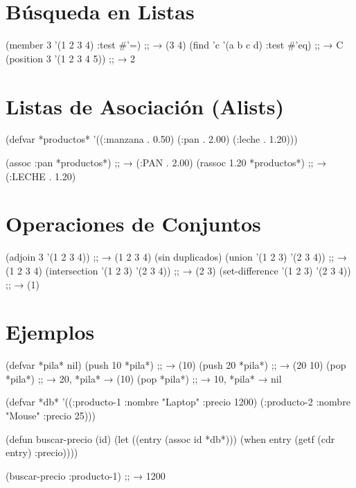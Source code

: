\section{Búsqueda en Listas}

\begin{lispcode}
(member 3 '(1 2 3 4) :test #'=)       ;; → (3 4)
(find 'c '(a b c d) :test #'eq)       ;; → C
(position 3 '(1 2 3 4 5))              ;; → 2
\end{lispcode}

\section{Listas de Asociación (Alists)}

\begin{lispcode}
(defvar *productos*
  '((:manzana . 0.50)
    (:pan . 2.00)
    (:leche . 1.20)))

(assoc :pan *productos*)   ;; → (:PAN . 2.00)
(rassoc 1.20 *productos*)  ;; → (:LECHE . 1.20)
\end{lispcode}

\section{Operaciones de Conjuntos}

\begin{lispcode}
(adjoin 3 '(1 2 3 4))                ;; → (1 2 3 4) (sin duplicados)
(union '(1 2 3) '(2 3 4))            ;; → (1 2 3 4)
(intersection '(1 2 3) '(2 3 4))     ;; → (2 3)
(set-difference '(1 2 3) '(2 3 4))   ;; → (1)
\end{lispcode}

\section{Ejemplos}

\begin{examplebox}[title=Construcción incremental con push/pop]
\begin{lispcode}
(defvar *pila* nil)
(push 10 *pila*)     ;; → (10)
(push 20 *pila*)     ;; → (20 10)
(pop *pila*)         ;; → 20, *pila* → (10)
(pop *pila*)         ;; → 10, *pila* → nil
\end{lispcode}
\end{examplebox}

\begin{examplebox}[title=Base de datos de productos con alists]
\begin{lispcode}
(defvar *db*
  '((:producto-1 :nombre "Laptop" :precio 1200)
    (:producto-2 :nombre "Mouse"  :precio 25)))

(defun buscar-precio (id)
  (let ((entry (assoc id *db*)))
    (when entry
      (getf (cdr entry) :precio))))

(buscar-precio :producto-1)  ;; → 1200
\end{lispcode}
\end{examplebox}

